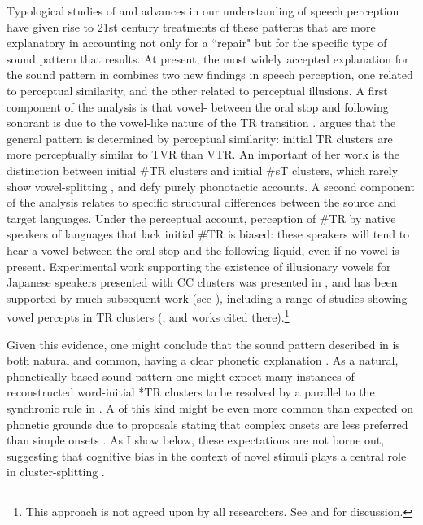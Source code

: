 \documentclass[output=paper,
modfonts
]{LSP/langsci}
\begin{document}
\largerpage[-1]
Typological studies of   and advances in our
understanding of speech perception have given rise to 21st century
treatments of these patterns that are more explanatory in accounting not
only for a ``repair" but for the specific type of sound pattern that
results. At present, the most widely accepted explanation for the sound
pattern in  combines two new findings in speech perception, one
related to perceptual similarity, and the other related to perceptual
illusions. A first component of the analysis is that vowel-
between the oral stop and following sonorant is due to the vowel-like
nature of the TR transition \citep{fleischhacker2001a, fleischhacker2005a,Kang2011, berent2013a, broselow2015a}. \citet{fleischhacker2001a, fleischhacker2005a} argues that the general
pattern is determined by perceptual similarity: initial TR clusters are
more perceptually similar to TVR than VTR. An important  of her
work is the distinction between initial \#TR clusters and initial \#sT
clusters, which rarely show vowel-splitting , and defy purely
phonotactic accounts. A second component of the analysis relates to
specific structural differences between the source and target languages.
Under the perceptual account, perception of \#TR by native speakers of
languages that lack initial \#TR is biased: these speakers will tend to
hear a vowel between the oral stop and the following liquid, even if no
vowel is present. Experimental work supporting the existence of
illusionary vowels for Japanese speakers presented with CC clusters was
presented in \citet{dupoux1999a}, and has been supported by much
subsequent work (see \citealt{peperkamp2002a,kang2003a,Kang2011,kabak2007a,davidson2012a}), including a range of studies
showing vowel percepts in TR clusters (\citealt{berent2013a}, and works cited
there).\footnote{This approach is not agreed upon by all researchers.
  See \citet{uffmann2007a} and \citet{hall2011a} for discussion.}

Given this evidence, one might conclude that the sound pattern described
in  is both natural and common, having a clear phonetic explanation
\citep{blevins2004, blevins2008a, blevins2015a}. As a natural, phonetically-based sound
pattern one might expect many instances of reconstructed word-initial
*TR clusters to be resolved by a  parallel to the synchronic
rule in . A  of this kind might be even more common than
expected on phonetic grounds due to  proposals stating that
complex onsets are less preferred than simple onsets \citep{prince1993a,kager1999a}. As I show below, these expectations are not
borne out, suggesting that cognitive bias in the context of novel
stimuli plays a central role in cluster-splitting .
\end{document}
